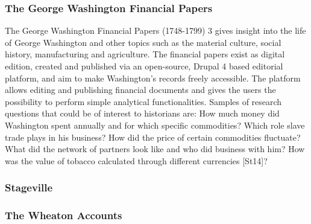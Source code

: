 \documentclass[12pt,a4paper]{article}
\begin{document}
\subsubsection{The George Washington Financial Papers}
The George Washington Financial Papers (1748-1799) 3 gives insight into the life of
George Washington and other topics such as the material culture, social history,
manufacturing and agriculture. The financial papers exist as digital edition, created and
published via an open-source, Drupal 4 based editorial platform, and aim to make
Washington’s records freely accessible. The platform allows editing and publishing
financial documents and gives the users the possibility to perform simple analytical
functionalities. Samples of research questions that could be of interest to historians are:
How much money did Washington spent annually and for which specific commodities?
Which role slave trade plays in his business? How did the price of certain commodities
fluctuate? What did the network of partners look like and who did business with him?
How was the value of tobacco calculated through different currencies [St14]?

\subsubsection{Stageville}

\subsubsection{The Wheaton Accounts}
\end{document}
